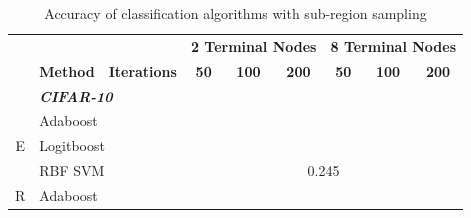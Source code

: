 \documentclass[12pt]{article}
\begin{document}
\begin{sloppypar}
\begin{table}[hbt!]
\centering
\caption{Accuracy of classification algorithms with sub-region sampling}
\label{tab:subsampling_results}
\begin{tabular}{lllllllll}
\hline
                                       & \textbf{}       & \multicolumn{1}{c}{\textbf{}}           & \multicolumn{3}{c}{\textbf{2 Terminal Nodes}}                                                         & \multicolumn{3}{c}{\textbf{8 Terminal Nodes}}                                                         \\
                                       & \textbf{Method} & \multicolumn{1}{c}{\textbf{Iterations}} & \multicolumn{1}{c}{\textbf{50}} & \multicolumn{1}{c}{\textbf{100}} & \multicolumn{1}{c}{\textbf{200}} & \multicolumn{1}{c}{\textbf{50}} & \multicolumn{1}{c}{\textbf{100}} & \multicolumn{1}{c}{\textbf{200}} \\ \hline
                                       & \multicolumn{2}{l}{\textit{\textbf{CIFAR-10}}}            &                                 &                                  &                                  &                                 &                                  &                                  \\
\multicolumn{1}{c}{\multirow{3}{*}{E}} & \multicolumn{2}{l}{Adaboost}                              &                                 &                                  &                                  &                                 &                                  &                                  \\
\multicolumn{1}{c}{}                   & \multicolumn{2}{l}{Logitboost}                            &                                 &                                  &                                  &                                 &                                  &                                  \\
\multicolumn{1}{c}{}                   & \multicolumn{2}{l}{RBF SVM}                               & \multicolumn{6}{c}{0.245}                                                                                                                                                                                     \\
\multirow{3}{*}{R}                     & \multicolumn{2}{l}{Adaboost}                              &                                 &                                  &                                  &                                 &                                  &                                  \\

\end{tabular}
\end{table}
\end{sloppypar}
\end{document}
